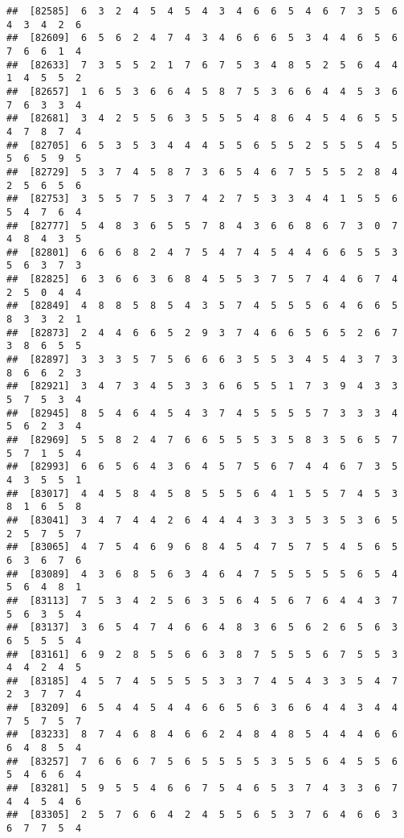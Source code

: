 \documentclass[
]{book}
\begin{document}
\begin{verbatim}
##  [82585]  6  3  2  4  5  4  5  4  3  4  6  6  5  4  6  7  3  5  6  4  3  4  2  6
##  [82609]  6  5  6  2  4  7  4  3  4  6  6  6  5  3  4  4  6  5  6  7  6  6  1  4
##  [82633]  7  3  5  5  2  1  7  6  7  5  3  4  8  5  2  5  6  4  4  1  4  5  5  2
##  [82657]  1  6  5  3  6  6  4  5  8  7  5  3  6  6  4  4  5  3  6  7  6  3  3  4
##  [82681]  3  4  2  5  5  6  3  5  5  5  4  8  6  4  5  4  6  5  5  4  7  8  7  4
##  [82705]  6  5  3  5  3  4  4  4  5  5  6  5  5  2  5  5  5  4  5  5  6  5  9  5
##  [82729]  5  3  7  4  5  8  7  3  6  5  4  6  7  5  5  5  2  8  4  2  5  6  5  6
##  [82753]  3  5  5  7  5  3  7  4  2  7  5  3  3  4  4  1  5  5  6  5  4  7  6  4
##  [82777]  5  4  8  3  6  5  5  7  8  4  3  6  6  8  6  7  3  0  7  4  8  4  3  5
##  [82801]  6  6  6  8  2  4  7  5  4  7  4  5  4  4  6  6  5  5  3  5  6  3  7  3
##  [82825]  6  3  6  6  3  6  8  4  5  5  3  7  5  7  4  4  6  7  4  2  5  0  4  4
##  [82849]  4  8  8  5  8  5  4  3  5  7  4  5  5  5  6  4  6  6  5  8  3  3  2  1
##  [82873]  2  4  4  6  6  5  2  9  3  7  4  6  6  5  6  5  2  6  7  3  8  6  5  5
##  [82897]  3  3  3  5  7  5  6  6  6  3  5  5  3  4  5  4  3  7  3  8  6  6  2  3
##  [82921]  3  4  7  3  4  5  3  3  6  6  5  5  1  7  3  9  4  3  3  5  7  5  3  4
##  [82945]  8  5  4  6  4  5  4  3  7  4  5  5  5  5  7  3  3  3  4  5  6  2  3  4
##  [82969]  5  5  8  2  4  7  6  6  5  5  5  3  5  8  3  5  6  5  7  5  7  1  5  4
##  [82993]  6  6  5  6  4  3  6  4  5  7  5  6  7  4  4  6  7  3  5  4  3  5  5  1
##  [83017]  4  4  5  8  4  5  8  5  5  5  6  4  1  5  5  7  4  5  3  8  1  6  5  8
##  [83041]  3  4  7  4  4  2  6  4  4  4  3  3  3  5  3  5  3  6  5  2  5  7  5  7
##  [83065]  4  7  5  4  6  9  6  8  4  5  4  7  5  7  5  4  5  6  5  6  3  6  7  6
##  [83089]  4  3  6  8  5  6  3  4  6  4  7  5  5  5  5  5  6  5  4  5  6  4  8  1
##  [83113]  7  5  3  4  2  5  6  3  5  6  4  5  6  7  6  4  4  3  7  5  6  3  5  4
##  [83137]  3  6  5  4  7  4  6  6  4  8  3  6  5  6  2  6  5  6  3  6  5  5  5  4
##  [83161]  6  9  2  8  5  5  6  6  3  8  7  5  5  5  6  7  5  5  3  4  4  2  4  5
##  [83185]  4  5  7  4  5  5  5  5  3  3  7  4  5  4  3  3  5  4  7  2  3  7  7  4
##  [83209]  6  5  4  4  5  4  4  6  6  5  6  3  6  6  4  4  3  4  4  7  5  7  5  7
##  [83233]  8  7  4  6  8  4  6  6  2  4  8  4  8  5  4  4  4  6  6  6  4  8  5  4
##  [83257]  7  6  6  6  7  5  6  5  5  5  5  3  5  5  6  4  5  5  6  5  4  6  6  4
##  [83281]  5  9  5  5  4  6  6  7  5  4  6  5  3  7  4  3  3  6  7  4  4  5  4  6
##  [83305]  2  5  7  6  6  4  2  4  5  5  6  5  3  7  6  4  6  6  3  6  7  7  5  4

\end{verbatim}
\end{document}
